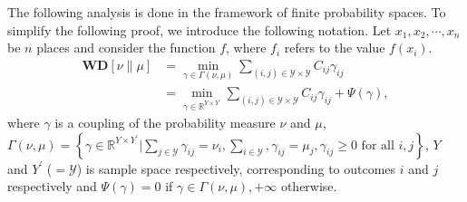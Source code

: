The following analysis is done in the framework of finite probability spaces.
To simplify the following proof, we introduce the following notation. Let $x_1, x_2, \cdots, x_n$ be $n$ places and consider the function $f$, where $f_i$ refers to the value $f(x_i)$.
\begin{equation}\label{eq:wd_dev}
    \begin{aligned}
     \textbf{WD}[\nu \| \mu]&= \min _{\gamma \in \Gamma(\nu, \mu)} \sum_{(i,j) \in \mathcal{Y}\times \mathcal{Y}}C_{ij}\gamma_{ij}\\
     &= \min _{\gamma \in\mathbb{R}^{Y \times Y^{\prime}}} \sum_{(i,j) \in \mathcal{Y}\times \mathcal{Y} } C_{ij} \gamma_{ij} + \Psi(\gamma),
     \end{aligned}
\end{equation}
where $\gamma$ is a coupling of the probability measure $\nu$ and $\mu$, $\Gamma(\nu, \mu)=\left\{\gamma \in \mathbb{R}^{Y \times Y^{\prime}} | \sum_{j \in \mathcal{Y}} \gamma_{i j}=\nu_i, \sum_{i \in \mathcal{Y}}, \gamma_{i j}=\mu_j, \gamma_{ij} \geq 0 \, \,\text{for all} \, \, i,j \right\}$, $Y$ and $Y^\prime$ ($=\mathcal{Y}$) is sample space respectively, corresponding to outcomes $i$ and $j$ respectively and $\Psi(\gamma) = 0 $ if $\gamma \in \Gamma(\nu, \mu), +\infty$ otherwise.


